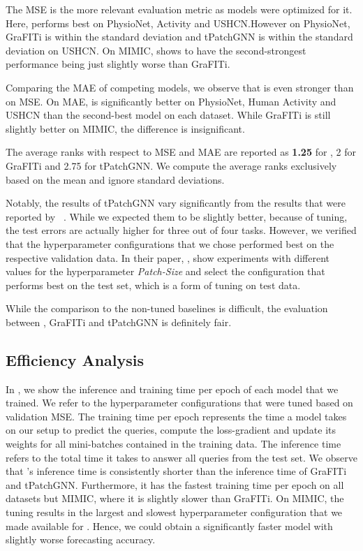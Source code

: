 The MSE is the more relevant evaluation metric as models were optimized for it. 
Here, \model{} performs best on PhysioNet, Activity and USHCN.\@ However on PhysioNet, GraFITi is within the standard deviation and tPatchGNN is within the standard deviation on USHCN.\@ 
On MIMIC, \model{} shows to have the second-strongest performance being just slightly worse than GraFITi.

Comparing the MAE of competing models, we observe that \model{} is even stronger than on MSE.\@ 
On MAE, \model{} is significantly better on PhysioNet, Human Activity and USHCN than the second-best model on each dataset. 
While GraFITi is still slightly better on MIMIC, the difference is insignificant.

The average ranks with respect to MSE and MAE are reported as \textbf{1.25} for \model{}, 2 for GraFITi and 2.75 for tPatchGNN.\@
We compute the average ranks exclusively based on the mean and ignore standard deviations. 

Notably, the results of tPatchGNN vary significantly from the results that were reported by \citeauthor{Zhang.Irregular}~\cite{Zhang.Irregular}.
While we expected them to be slightly better, because of tuning, the test errors are actually higher for three out of four tasks. 
However, we verified that the hyperparameter configurations that we chose performed best on the respective validation data. 
In their paper, \citeauthor{Zhang.Irregular}, show experiments with different values for the hyperparameter \emph{Patch-Size} and select the configuration that performs best on the test set, which is a form of tuning on test data. 

While the comparison to the non-tuned baselines is difficult, the evaluation between \model{}, GraFITi and tPatchGNN is definitely fair. 

\subsection{Efficiency Analysis}
In , we show the inference and training time per epoch of each model that we trained.
We refer to the hyperparameter configurations that were tuned based on validation MSE.\@ 
The training time per epoch represents the time a model takes on our setup to predict the queries, compute the loss-gradient and update its weights for all mini-batches contained in the training data.   
The inference time refers to the total time it takes to answer all queries from the test set.
We observe that \model{}'s inference time is consistently shorter than the inference time of GraFITi and tPatchGNN.\@
Furthermore, it has the fastest training time per epoch on all datasets but MIMIC, where it is slightly slower than GraFITi.
On MIMIC, the tuning results in the largest and slowest hyperparameter configuration that we made available for \model{}. 
Hence, we could obtain a significantly faster model with slightly worse forecasting accuracy. 


